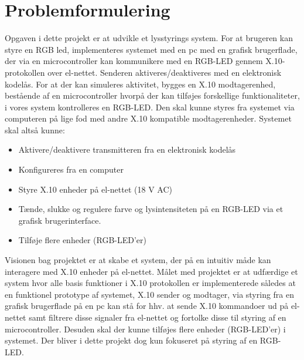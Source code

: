 \documentclass[oneside]{memoir}
\begin{document}
\section{Problemformulering}
\begin{flushleft}
Opgaven i dette projekt er at udvikle et lysstyrings system. For at brugeren kan styre en RGB led, implementeres systemet med en pc med en grafisk brugerflade, der via en microcontroller kan kommunikere med en RGB-LED gennem X.10-protokollen over el-nettet. Senderen aktiveres/deaktiveres med en elektronisk kodelås. 
For at der kan simuleres aktivitet, bygges en X.10 modtagerenhed, bestående af en microcontroller hvorpå der kan tilføjes forskellige funktionaliteter, i vores system kontrolleres en RGB-LED. Den skal kunne styres fra systemet via computeren på lige fod med andre X.10 kompatible modtagerenheder. 
Systemet skal altså kunne:
\begin{itemize}
	\item Aktivere/deaktivere transmitteren fra en elektronisk kodelås
	\item Konfigureres fra en computer
	\item Styre X.10 enheder på el-nettet (18 V AC)
	\item Tænde, slukke og regulere farve og lysintensiteten på en RGB-LED via et grafisk brugerinterface.
	\item Tilføje flere enheder (RGB-LED'er)
\end{itemize}
Visionen bag projektet er at skabe et system, der på en intuitiv måde kan interagere med X.10 enheder på el-nettet. 
Målet med projektet er at udfærdige et system hvor alle basis funktioner i X.10 protokollen er implementerede således at en funktionel prototype af systemet, X.10 sender og modtager, via styring fra en grafisk brugerflade på en pc kan stå for hhv. at sende X.10 kommandoer ud på el-nettet samt filtrere disse signaler fra el-nettet og fortolke disse til styring af en microcontroller. Desuden skal der kunne tilføjes flere enheder (RGB-LED'er) i systemet. Der bliver i dette projekt dog kun fokuseret på styring af en RGB-LED.
\end{flushleft}
\newpage
\end{document}
